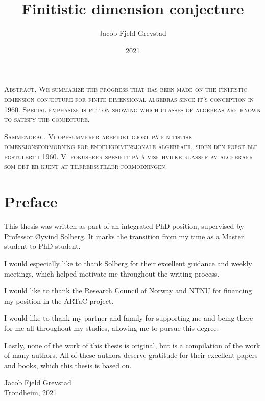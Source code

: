 \documentclass[11pt, english, twoside]{article}
\theoremstyle{definition}
\begin{document}
\title{Finitistic dimension conjecture}
\author{Jacob Fjeld Grevstad}
\date{2021}
{}

%
\noindent \scshape\mdseries Abstract. \normalfont
We summarize the progress that has been made on the finitistic dimension conjecture for finite dimensional algebras since it's conception in 1960. Special emphasize is put on showing which classes of algebras are known to satisfy the conjecture.

\noindent \scshape\mdseries Sammendrag. \normalfont
Vi oppsummerer arbeidet gjort på finitistisk dimensjonsformodning for endeligdimensjonale algebraer, siden den først ble postulert i 1960. Vi fokuserer spesielt på å vise hvilke klasser av algebraer som det er kjent at tilfredsstiller formodningen.
\clearpage

\section*{Preface}
%
This thesis was written as part of an integrated PhD position, supervised by Professor Øyvind Solberg. It marks the transition from my time as a Master student to PhD student.

I would especially like to thank Solberg for their excellent guidance and weekly meetings, which helped motivate me throughout the writing process. 

I would like to thank the Research Council of Norway and NTNU for financing my position in the ARTaC project.

I would like to thank my partner and family for supporting me and being there for me all throughout my studies, allowing me to pursue this degree.

Lastly, none of the work of this thesis is original, but is a compilation of the work of many authors. All of these authors deserve gratitude for their excellent papers and books, which this thesis is based on. 
\begin{flushright}
	Jacob Fjeld Grevstad\\ 
	Trondheim, 2021
\end{flushright}
\clearpage

\tableofcontents
\clearpage
\end{document}
